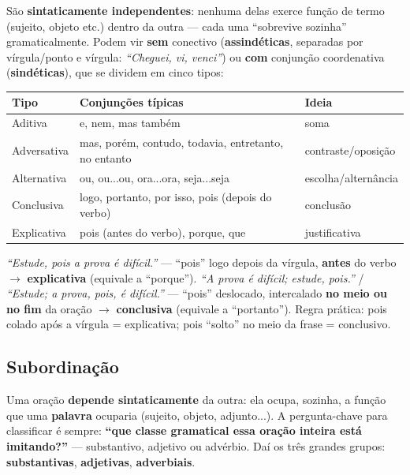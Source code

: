 \begin{conceito}
São \textbf{sintaticamente independentes}: nenhuma delas exerce função de
termo (sujeito, objeto etc.) dentro da outra --- cada uma “sobrevive
sozinha” gramaticalmente. Podem vir \textbf{sem} conectivo
(\textbf{assindéticas}, separadas por vírgula/ponto e vírgula: \textit{“Cheguei,
vi, venci”}) ou \textbf{com} conjunção coordenativa (\textbf{sindéticas}),
que se dividem em cinco tipos:

\begin{center}
\begin{tabular}{@{}p{2.6cm}p{4.6cm}p{4.8cm}@{}}
\toprule
\textbf{Tipo} & \textbf{Conjunções típicas} & \textbf{Ideia} \\
\midrule
Aditiva & e, nem, mas também & soma \\
Adversativa & mas, porém, contudo, todavia, entretanto, no entanto & contraste/oposição \\
Alternativa & ou, ou...ou, ora...ora, seja...seja & escolha/alternância \\
Conclusiva & logo, portanto, por isso, pois (depois do verbo) & conclusão \\
Explicativa & pois (antes do verbo), porque, que & justificativa \\
\bottomrule
\end{tabular}
\end{center}
\end{conceito}

\begin{cuidado}
\textit{“Estude, pois a prova é difícil.”} --- “pois” logo depois da vírgula,
\textbf{antes} do verbo $\to$ \textbf{explicativa} (equivale a “porque”).
\textit{“A prova é difícil; estude, pois.”} / \textit{“Estude; a prova, pois,
é difícil.”} --- “pois” deslocado, intercalado \textbf{no meio ou no fim} da
oração $\to$ \textbf{conclusiva} (equivale a “portanto”). Regra prática:
pois colado após a vírgula = explicativa; pois “solto” no meio da frase =
conclusivo.
\end{cuidado}

\subsection{Subordinação}

\begin{conceito}
Uma oração \textbf{depende sintaticamente} da outra: ela ocupa, sozinha, a
função que uma \textbf{palavra} ocuparia (sujeito, objeto, adjunto...). A
pergunta-chave para classificar é sempre: \textbf{“que classe gramatical essa
oração inteira está imitando?”} --- substantivo, adjetivo ou advérbio. Daí os
três grandes grupos: \textbf{substantivas}, \textbf{adjetivas},
\textbf{adverbiais}.
\end{conceito}


